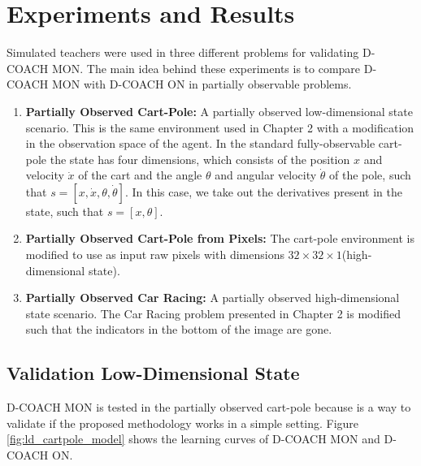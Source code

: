 \section{Experiments and Results}
Simulated teachers were used in three different problems for validating D-COACH MON. The main idea behind these experiments is to compare D-COACH MON with D-COACH ON in partially observable problems.

\begin{enumerate}
    \item \textbf{Partially Observed Cart-Pole:} A partially observed low-dimensional state scenario. This is the same environment used in Chapter 2 with a modification in the observation space of the agent. In the standard fully-observable cart-pole the state has four dimensions, which consists of the position $x$ and velocity $\dot x$ of the cart and the angle $\theta$ and angular velocity $\dot \theta$ of the pole, such that $s=[x, \dot x, \theta, \dot \theta]$. In this case, we take out the derivatives present in the state, such that $s=[x, \theta]$.
    \item \textbf{Partially Observed Cart-Pole from Pixels:} The cart-pole environment is modified to use as input raw pixels with dimensions $32\times32\times1$(high-dimensional state). 
    \item \textbf{Partially Observed Car Racing:} A partially observed high-dimensional state scenario. The Car Racing problem presented in Chapter 2 is modified such that the indicators in the bottom of the image are gone. 
    
\end{enumerate}

\subsection{Validation Low-Dimensional State}

D-COACH MON is tested in the partially observed cart-pole because is a way to validate if the proposed methodology works in a simple setting. Figure \ref{fig:ld_cartpole_model} shows the learning curves of D-COACH MON and D-COACH ON. 

